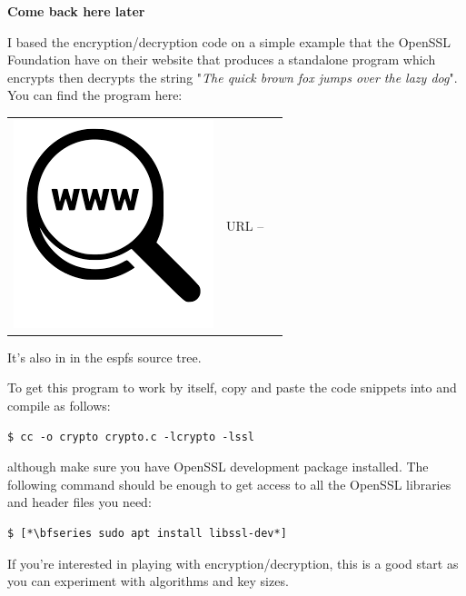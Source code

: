 
\noindent
\textbf{Come back here later}

I based the encryption/decryption code on a simple example that the OpenSSL Foundation have on their website that produces a standalone program which encrypts then decrypts the string "\textit{The quick brown fox jumps over the lazy dog}". You can find the program here:

\begin{table}[h]
\begin{tabular}{lcl}
\parbox[r]{0.5in}{\includegraphics[scale=0.15]{figures/url.png}} & \parbox[l]{0.55in}{URL  -- } & \parbox[l]{3in}{}
\end{tabular}
\end{table}

\noindent
It's also in  in the espfs source tree.

To get this program to work by itself, copy and paste the code snippets into  and compile as follows:

\begin{lstlisting}
$ cc -o crypto crypto.c -lcrypto -lssl
\end{lstlisting}

\noindent
although make sure you have OpenSSL development package installed. The following command should be enough to get access to all the OpenSSL libraries and header files you need:

\begin{lstlisting}
$ [*\bfseries sudo apt install libssl-dev*]
\end{lstlisting}

\noindent
If you're interested in playing with encryption/decryption, this is a good start as you can experiment with algorithms and key sizes.

